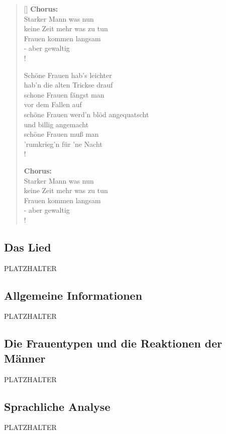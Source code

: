\documentclass[12pt,a4paper]{scrartcl}
\begin{document}
\begin{verse}[\versewidth]
\textbf{Chorus:}\\
Starker Mann was nun\\
keine Zeit mehr was zu tun\\
Frauen kommen langsam\\
- aber gewaltig\\!


Schöne Frauen hab's leichter\\
hab'n die alten Trickse drauf\\
schone Frauen fängst man\\
vor dem Fallen auf\\
schöne Frauen werd'n blöd angequatscht\\
und billig angemacht\\
schöne Frauen muß man\\
'rumkrieg'n für 'ne Nacht\\!

\textbf{Chorus:}\\
Starker Mann was nun\\
keine Zeit mehr was zu tun\\
Frauen kommen langsam\\
- aber gewaltig\\!

 \end{verse}
\subsection{Das Lied} 
PLATZHALTER

\subsection{Allgemeine Informationen} 
PLATZHALTER



\subsection{Die Frauentypen und die Reaktionen der Männer} 
PLATZHALTER

\subsection{Sprachliche Analyse}
PLATZHALTER
\end{document}
